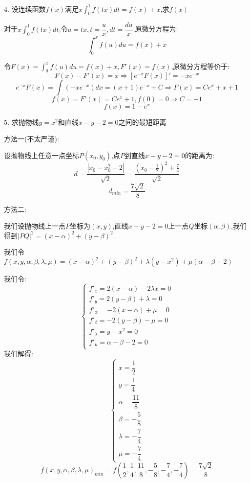 
4. 设连续函数$f(x)$满足$x\int_{0}^{1}f(tx)dt=f(x)+x$,求$f(x)$
\begin{solution}
	
	对于$x\int_{0}^{1}f(tx)dt$,令$u=tx,t=\dfrac{u}{x},dt=\dfrac{du}{x}$,原微分方程为: 
	$$\int_{0}^{x}f(u)du=f(x)+x$$
	
	令$F(x)=\int_{0}^{x}f(u)du=f(x)+x,F'(x)=f(x)$,原微分方程等价于: 
	$$F(x)-F'(x)=x\Rightarrow [e^{-x}F(x)]'=-xe^{-x}$$
	$$e^{-x}F(x)=\int(-xe^{-x})dx=(x+1)e^{-x}+C\Rightarrow F(x)=Ce^{x}+x+1$$
	$$f(x)=F'(x)=Ce^{x}+1,f(0)=0\Rightarrow C=-1$$
	$$f(x)=1-e^{x}$$
\end{solution}


5. 求抛物线$y=x^2$和直线$x-y-2=0$之间的最短距离
\begin{solution}
	
	方法一(不太严谨): 
	
	设抛物线上任意一点坐标$P(x_{0},y_{0})$,点$P$到直线$x-y-2=0$的距离为: 
	$$d=\dfrac{|x_{0}-x_{0}^2-2|}{\sqrt{2}}=\dfrac{(x_{0}-\frac{1}{2})^2+\frac{7}{4}}{\sqrt{2}}$$
	$$d_{min}=\dfrac{7\sqrt{2}}{8}$$
	
	方法二: 
	
	我们设抛物线上一点$P$坐标为$(x,y)$,直线$x-y-2=0$上一点$Q$坐标$(\alpha,\beta)$,我们得到$|PQ|^2=(x-\alpha)^2+(y-\beta)^2$.
	
	我们令$f(x,y,\alpha,\beta,\lambda,\mu)=(x-\alpha)^2+(y-\beta)^2+\lambda(y-x^2)+\mu(\alpha-\beta-2)$
	
	我们令: $$\left\lbrace 
	\begin{array}{l}
		f'_{x}=2(x-\alpha)-2\lambda x=0\\
		f'_{y}=2(y-\beta)+\lambda=0\\
		f'_{\alpha}=-2(x-\alpha)+\mu=0\\
		f'_{\beta}=-2(y-\beta)-\mu=0\\
		f'_{\lambda}=y-x^2=0\\
		f'_{\mu}=\alpha-\beta-2=0
	\end{array}
	\right. $$
	我们解得: $$\left\lbrace 
	\begin{array}{l}
		x=\dfrac{1}{2}\\
		y=\dfrac{1}{4}\\
		\alpha=\dfrac{11}{8}\\
		\beta=-\dfrac{5}{8}\\
		\lambda=-\dfrac{7}{4}\\
		\mu=-\dfrac{7}{4}
	\end{array}
	\right. $$
	$$f(x,y,\alpha,\beta,\lambda,\mu)_{min}=f(\dfrac{1}{2},\dfrac{1}{4},\dfrac{11}{8},-\dfrac{5}{8},-\dfrac{7}{4},-\dfrac{7}{4})=\dfrac{7\sqrt{2}}{8}$$
\end{solution}

